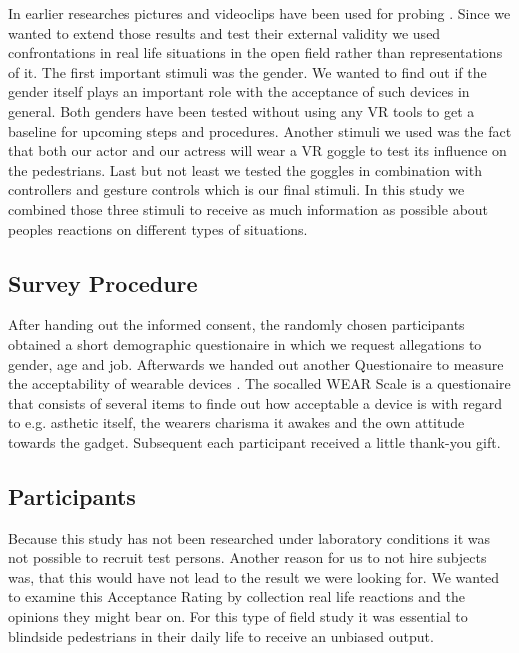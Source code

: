 \documentclass[sigchi]{acmart}
\begin{document}
In earlier researches pictures and videoclips have been used for probing \cite{schwind2018virtual}. Since we wanted to extend those results and test their external validity we used confrontations in real life situations in the open field rather than representations of it. The first important stimuli was the gender. We wanted to find out if the gender itself plays an important role with the acceptance of such devices in general. Both genders have been tested without using any VR tools to get a baseline for upcoming steps and procedures. Another stimuli we used was the fact that both our actor and our actress will wear a VR goggle to test its influence on the pedestrians. Last but not least we tested the goggles in combination with controllers and gesture controls which is our final stimuli. In this study we combined those three stimuli to receive as much information as possible about peoples reactions on different types of situations.

\subsection{Survey Procedure}

After handing out the informed consent, the randomly chosen participants obtained a short demographic questionaire in which we request allegations to gender, age and job. Afterwards we handed out another Questionaire to measure the acceptability of wearable devices \cite{kelly2016wear}. The socalled WEAR Scale is a questionaire that consists of several items to finde out how acceptable a device is with regard to e.g. asthetic itself, the wearers charisma it awakes and the own attitude towards the gadget. Subsequent each participant received a little thank-you gift.

\subsection{Participants}

Because this study has not been researched under laboratory conditions it was not possible to recruit test persons. Another reason for us to not hire subjects was, that this would have not lead to the result we were looking for. We wanted to examine this Acceptance Rating by collection real life reactions and the opinions they might bear on. For this type of field study it was essential to blindside pedestrians in their daily life to receive an unbiased output. 




\appendix
\end{document}
